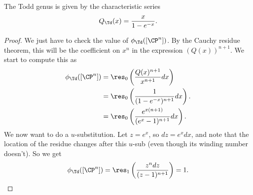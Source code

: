 \documentclass[11pt]{book}
\begin{document}
\begin{theorem}
The Todd genus is given by the characteristic series
\begin{align*}
    Q_\Td(x) = \frac{x}{1-e^{-x}}.
\end{align*}
\end{theorem}
\begin{proof} We just have to check the value of $\phi_\Td([\CP^n])$. By the Cauchy residue theorem, this will be the coefficient on $x^n$ in the expression $(Q(x))^{n+1}$. We start to compute this as
\begin{align*}
    \phi_\Td([\CP^n]) &= \res_0 \left( \frac{Q(x)^{n+1}}{x^{n+1}} dx \right) \\
    &= \res_0 \left( \frac{1}{(1- e^{-x})^{n+1}} dx \right). \\
    &= \res_0 \left( \frac{e^{x(n+1)}}{(e^x - 1)^{n+1}}dx \right).
\end{align*}
We now want to do a $u$-substitution. Let $z=e^x$, so $dz = e^xdx$, and note that the location of the residue changes after this $u$-sub (even though its winding number doesn't). So we get
\begin{align*}
    \phi_{\Td}([\CP^n]) = \res_1 \left( \frac{z^n dz}{(z-1)^{n+1}} \right) = 1.
\end{align*}
\end{proof}
\end{document}
